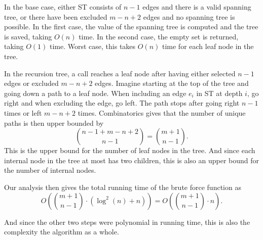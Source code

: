 In the base case, either ST consists of $n-1$ edges and there is a valid spanning tree, or there have been excluded $m-n+2$ edges and no spanning tree is possible. In the first case, the value of the spanning tree is computed and the tree is saved, taking $O(n)$ time. In the second case, the empty set is returned, taking $O(1)$ time. Worst case, this takes $O(n)$ time for each leaf node in the tree. 

In the recursion tree, a call reaches a leaf node after having either selected $n-1$ edges or excluded $m-n+2$ edges. Imagine starting at the top of the tree and going down a path to a leaf node. When including an edge $e_i$ in ST at depth $i$, go right and when excluding the edge, go left. The path stops after going right $n-1$ times or left $m-n+2$ times. Combinatorics gives that the number of unique paths is then upper bounded by
\[
    \binom{n-1+m-n+2}{n-1} = \binom{m+1}{n-1}. 
\]
This is the upper bound for the number of leaf nodes in the tree. And since each internal node in the tree at most has two children, this is also an upper bound for the number of internal nodes. 

Our analysis then gives the total running time of the brute force function as
\[
    O\left(\binom{m+1}{n-1} \cdot \left(\log^2(n) + n\right)\right) = O\left(\binom{m+1}{n-1}\cdot n\right).
\]

And since the other two steps were polynomial in running time, this is also the complexity the algorithm as a whole. 
